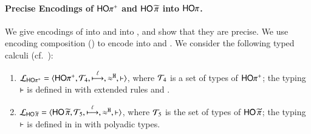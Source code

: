 \documentclass[runningheads]{llncs}
\begin{document}
{%
\paragraph{Precise Encodings of $\mathsf{HO\pi^{+}}$ and $\mathsf{HO}\,{\widetilde{\pi}}$ into $\mathsf{HO}\pi$.}
We give  %
encodings of \HOpp into \HOp
and into \PHOp, and show that they are precise. 
We use encoding composition () to encode
\PHOpp into \HO and \sessp.
We consider the following 
typed calculi (cf.~):
\begin{enumerate}[-]
\item $\mathcal{L}_{\mathsf{HO\pi^{+}}}=\langle \mathsf{HO\pi^{+}}, {\cal{T}}_4, \stackrel{\ell}{\longmapsto}, \approx^\mathtt{H}, \vdash \rangle$,
where 
	${\cal{T}}_4$ is a set of types of $\mathsf{HO\pi^{+}}$;  
the typing $\vdash$ is defined in 
with extended rules  and .

\item 
	$\mathcal{L}_{\mathsf{HO}\,{\widetilde{\pi}}}=\langle \mathsf{HO}\,{\widetilde{\pi}}, {\cal{T}}_5, \stackrel{\ell}{\longmapsto}, \approx^\mathtt{H}, \vdash \rangle$,
where 
	${\cal{T}}_5$ is the set of types of $\mathsf{HO}\,{\widetilde{\pi}}$;  
the typing $\vdash$ is defined in
in 
with polyadic types.
\end{enumerate}

%

}
\end{document}
